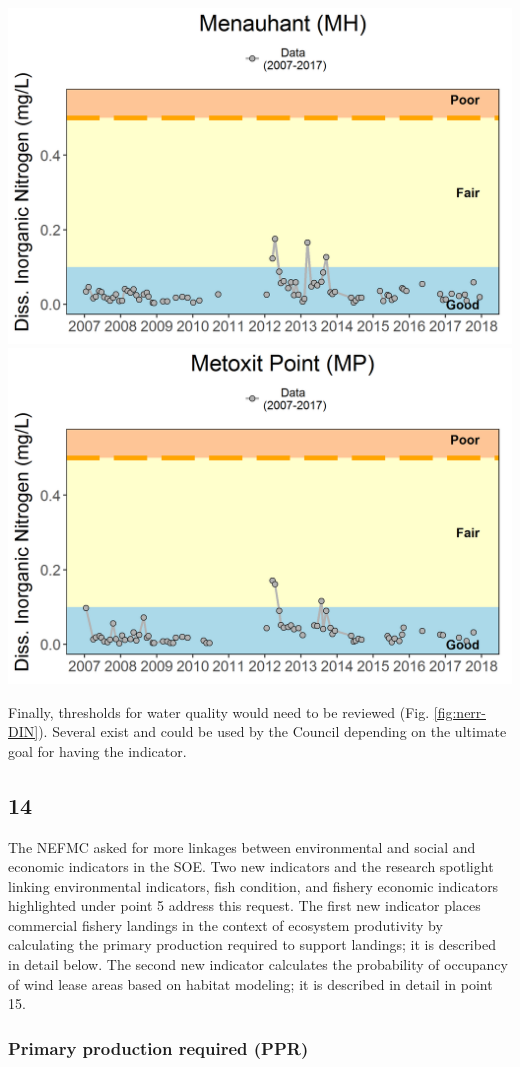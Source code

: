 \documentclass[
  10pt,
]{article}
\let\origfigure\figure
\let\endorigfigure\endfigure
\renewenvironment{figure}[1][2] {
    \expandafter\origfigure\expandafter[H]
} {
    \endorigfigure
}
\begin{document}
\begin{figure}

{\centering \includegraphics[width=0.49\linewidth]{images/NERRs_MH_DIN} \includegraphics[width=0.49\linewidth]{images/NERRs_MP_DIN} 

}

\caption{Dissolved Inorganic Nitrogen (DIN) in two locations.}\label{fig:nerr-DIN}
\end{figure}

Finally, thresholds for water quality would need to be reviewed (Fig.
\ref{fig:nerr-DIN}). Several exist and could be used by the Council
depending on the ultimate goal for having the indicator.

\hypertarget{section-13}{%
\subsection{14}\label{section-13}}

The NEFMC asked for more linkages between environmental and social and
economic indicators in the SOE. Two new indicators and the research
spotlight linking environmental indicators, fish condition, and fishery
economic indicators highlighted under point 5 address this request. The
first new indicator places commercial fishery landings in the context of
ecosystem produtivity by calculating the primary production required to
support landings; it is described in detail below. The second new
indicator calculates the probability of occupancy of wind lease areas
based on habitat modeling; it is described in detail in point 15.

\hypertarget{primary-production-required-ppr}{%
\subsubsection{Primary production required
(PPR)}\label{primary-production-required-ppr}}
\end{document}
